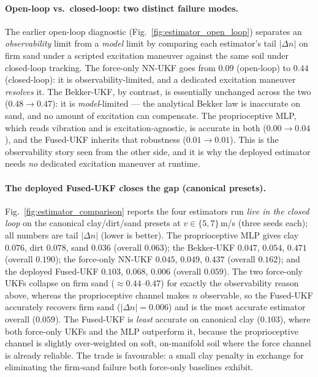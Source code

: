 \documentclass[conference,letterpaper,10pt]{IEEEtran}
\begin{document}
\paragraph{Open-loop vs.\ closed-loop: two distinct failure modes.}
The earlier open-loop diagnostic (Fig.~\ref{fig:estimator_open_loop})
separates an \emph{observability} limit from a \emph{model} limit by
comparing each estimator's tail $|\Delta n|$ on firm sand under a
scripted excitation maneuver against the same soil under closed-loop
tracking. The force-only NN-UKF goes from $0.09$ (open-loop) to $0.44$
(closed-loop): it is observability-limited, and a dedicated excitation
maneuver \emph{resolves} it. The Bekker-UKF, by contrast, is essentially
unchanged across the two ($0.48\!\to\!0.47$): it is \emph{model}-limited
--- the analytical Bekker law is inaccurate on sand, and no amount of
excitation can compensate. The
proprioceptive MLP, which reads vibration and is excitation-agnostic,
is accurate in both ($0.00\!\to\!0.04$), and the Fused-UKF inherits that
robustness ($0.01\!\to\!0.01$). This is the observability story seen
from the other side, and it is why the deployed estimator needs
\emph{no} dedicated excitation maneuver at runtime.

\paragraph{The deployed Fused-UKF closes the gap (canonical presets).}
Fig.~\ref{fig:estimator_comparison} reports the four estimators run
\emph{live in the closed loop} on the canonical clay/dirt/sand presets
at $v\!\in\!\{5,7\}\,$m/s (three seeds each); all numbers are tail
$|\Delta n|$ (lower is better). The proprioceptive MLP gives clay
$0.076$, dirt $0.078$, sand $0.036$ (overall $0.063$); the Bekker-UKF
$0.047$, $0.054$, $0.471$ (overall $0.190$); the force-only NN-UKF
$0.045$, $0.049$, $0.437$ (overall $0.162$); and the deployed Fused-UKF
$0.103$, $0.068$, $0.006$ (overall $0.059$). The two force-only UKFs
collapse on firm sand ($\approx\!0.44\text{--}0.47$) for exactly the
observability reason above, whereas the proprioceptive channel makes
$n$ observable, so the Fused-UKF accurately recovers firm sand
($|\Delta n|\!=\!0.006$) and is the most accurate estimator overall
($0.059$). The Fused-UKF is \emph{least} accurate on canonical clay
($0.103$), where both force-only UKFs and the MLP outperform it, because
the proprioceptive channel is slightly over-weighted on soft, on-manifold
soil where the force channel is already reliable. The trade is
favourable: a small clay penalty in exchange for eliminating the
firm-sand failure both force-only baselines exhibit.
\end{document}

